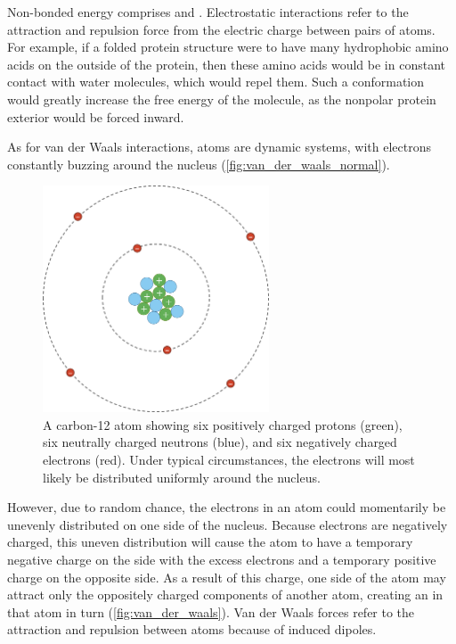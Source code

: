 Non-bonded energy comprises  and . Electrostatic interactions refer to the attraction and repulsion force from the electric charge between pairs of atoms. For example, if a folded protein structure were to have many hydrophobic amino acids on the outside of the protein, then these amino acids would be in constant contact with water molecules, which would repel them. Such a conformation would greatly increase the free energy of the molecule, as the nonpolar protein exterior would be forced inward.

As for van der Waals interactions, atoms are dynamic systems, with electrons constantly buzzing around the nucleus (\autoref{fig:van_der_waals_normal}).\\

\begin{figure}[h]
	\centering
	\mySfFamily
	\includegraphics[width = 0.6\textwidth]{../images/van_der_waals_normal.png}
	\caption{A carbon-12 atom showing six positively charged protons (green), six neutrally charged neutrons (blue), and six negatively charged electrons (red). Under typical circumstances, the electrons will most likely be distributed uniformly around the nucleus.}
	\label{fig:van_der_waals_normal}
\end{figure}

However, due to random chance, the electrons in an atom could momentarily be unevenly distributed on one side of the nucleus. Because electrons are negatively charged, this uneven distribution will cause the atom to have a temporary negative charge on the side with the excess electrons and a temporary positive charge on the opposite side. As a result of this charge, one side of the atom may attract only the oppositely charged components of another atom, creating an  in that atom in turn (\autoref{fig:van_der_waals}). Van der Waals forces refer to the attraction and repulsion between atoms because of induced dipoles.\\

